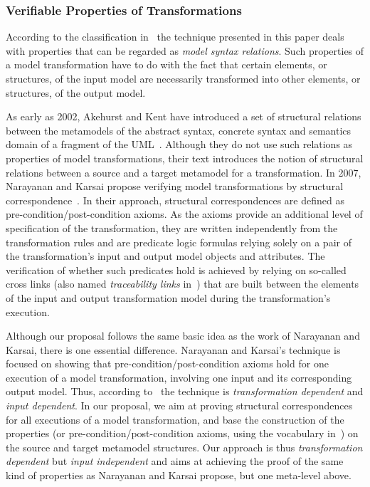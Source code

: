 \subsubsection*{Verifiable Properties of Transformations} According to the classification in~\cite{DBLP:conf/icst/AmraniLSCDVTC12} the technique presented in this paper deals with properties that can be regarded as \emph{model syntax relations}. Such properties of a model transformation have to do with the fact that certain elements, or structures, of the input model are necessarily transformed into other elements, or structures, of the output model. 

As early as 2002, Akehurst and Kent have introduced a set of structural relations between the metamodels of the abstract syntax, concrete syntax and semantics domain of a fragment of the UML~\cite{Akehurst:02}. Although they do not use such relations as properties of model transformations, their text introduces the notion of structural relations between a source and a target metamodel for a transformation. In 2007, Narayanan and Karsai propose verifying model transformations by structural correspondence~\cite{Narayanan:07}. In their approach, structural correspondences are defined as pre-condition/post-condition axioms. As the axioms provide an additional level of specification of the transformation, they are written independently from the transformation rules and are predicate logic formulas relying solely on a pair of the transformation's input and output model objects and attributes. The verification of whether such predicates hold is achieved by relying on so-called cross links (also named \emph{traceability links} in~\cite{DBLP:conf/icst/AmraniLSCDVTC12}) that are built between the elements of the input and output transformation model during the transformation's execution.

Although our proposal follows the same basic idea as the work of Narayanan and Karsai, there is one essential difference. Narayanan and Karsai's technique is focused on showing that pre-condition/post-condition axioms hold for one execution of a model transformation, involving one input and its corresponding output model. Thus, according to~\cite{DBLP:conf/icst/AmraniLSCDVTC12} the technique is \emph{transformation dependent} and \emph{input dependent}. In our proposal, we aim at proving structural correspondences for all executions of a model transformation, and base the construction of the properties (or pre-condition/post-condition axioms, using the vocabulary in~\cite{Narayanan:07}) on the source and target metamodel structures. Our approach is thus \emph{transformation dependent} but \emph{input independent} and aims at achieving the proof of the same kind of properties as Narayanan and Karsai propose, but one meta-level above.

